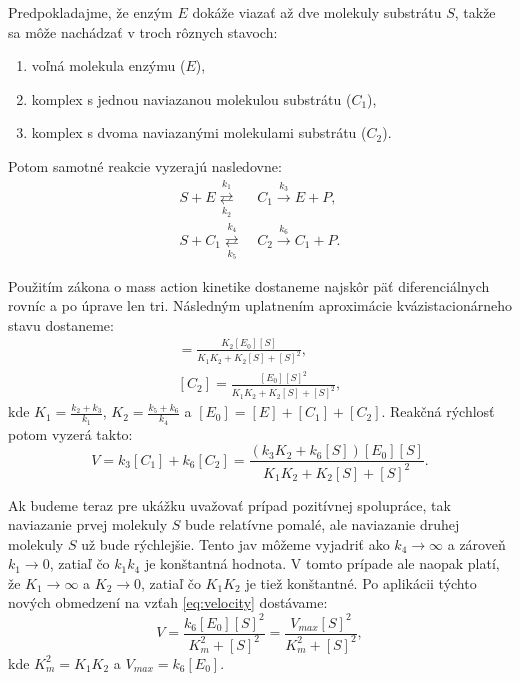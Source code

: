 \documentclass[11pt,final,oneside]{fithesis}
\begin{document}
Predpokladajme, \v ze enz\'ym $E$ dok\'a\v ze viaza\v t a\v z dve molekuly substr\'atu $S$, tak\v ze sa m\^ o\v ze nach\'adza\v t v troch r\^ oznych stavoch:
\begin{enumerate}
\item vo\v ln\'a molekula enz\'ymu ($E$),
\item komplex s jednou naviazanou molekulou substr\'atu ($C_1$),
\item komplex s dvoma naviazan\'ymi molekulami substr\'atu ($C_2$).
\end{enumerate}
Potom samotn\'e reakcie vyzeraj\'u nasledovne:
\begin{align}
S + E \underset{k_2}{\overset{k_1}{\rightleftarrows}} \ &C_1 \overset{k_3}{\longrightarrow} E + P,\\
S + C_1 \underset{k_5}{\overset{k_4}{\rightleftarrows}} \ &C_2 \overset{k_6}{\longrightarrow} C_1 + P.
\end{align}

Pou\v zit\'im z\'akona o mass action kinetike dostaneme najsk\^ or p\"a\v t diferenci\'alnych rovn\'ic a po \'uprave len tri. N\'asledn\'ym uplatnen\'im
aproxim\'acie kv\'azistacion\'arneho stavu dostaneme:
\begin{align}
[C_1] = \frac{K_2[E_0][S]}{K_1K_2 + K_2[S] + [S]^2},\\
[C_2] = \frac{[E_0][S]^2}{K_1K_2 + K_2[S] + [S]^2},
\end{align}
kde $K_1 = \frac{k_2 + k_3}{k_1}$, $K_2 = \frac{k_5 + k_6}{k_4}$ a $[E_0] = [E] + [C_1] + [C_2]$. Reak\v cn\'a r\'ychlos\v t potom vyzer\'a takto:
\begin{equation}
\label{eq:velocity}
V = k_3[C_1] + k_6[C_2] = \frac{(k_3K_2 + k_6[S])[E_0][S]}{K_1K_2 + K_2[S] + [S]^2}.
\end{equation}

Ak budeme teraz pre uk\'a\v zku uva\v zova\v t pr\'ipad pozit\'ivnej spolupr\'ace, tak naviazanie prvej molekuly $S$ bude relat\'ivne pomal\'e, ale
naviazanie druhej molekuly $S$ u\v z bude r\'ychlej\v sie. Tento jav m\^ o\v zeme vyjadri\v t ako $k_4 \rightarrow \infty$ a z\'arove\v n $k_1 \rightarrow 0$,
zatia\v l \v co $k_1k_4$ je kon\v stantn\'a hodnota. V tomto pr\'ipade ale naopak plat\'i, \v ze $K_1 \rightarrow \infty$ a $K_2 \rightarrow 0$, zatia\v l 
\v co $K_1K_2$ je tie\v z kon\v stantn\'e. Po aplik\'acii t\'ychto nov\'ych obmedzen\'i na vz\v tah \ref{eq:velocity} dost\'avame:
\begin{equation}
V = \frac{k_6[E_0][S]^2}{K_m^2 + [S]^2} = \frac{V_{max}[S]^2}{K_m^2 + [S]^2},
\end{equation}
kde $K_m^2 = K_1K_2$ a $V_{max} = k_6[E_0]$.
\end{document}
